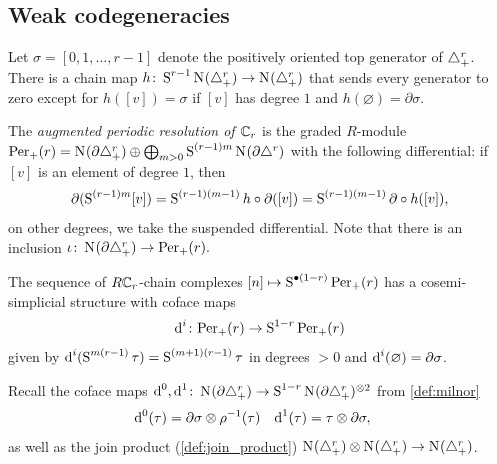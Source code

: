 \subsection{Weak codegeneracies} Let $\sigma = [0,1,\ldots,r-1]$ denote the positively oriented top generator of $\triangle_{+}^{r}$. There is a chain map $h\colon \operatorname{S}^{r-1}\operatorname{N}_{}(\triangle_{+}^{r})\to \operatorname{N}_{}(\triangle_{+}^{r})$ that sends every generator to zero except for $h([v]) = \sigma$ if $[v]$ has degree $1$ and $h(\varnothing) = \partial \sigma$. 
\begin{definition}\cite[Section~I.6]{Brown-cohomology-of-groups}
	The \emph{augmented periodic resolution of $\mathbb{C}_r$} is the graded $R$-module $\mathrm{Per}_+(r) = \operatorname{N}_{}(\partial\triangle_{+}^{r})\oplus \bigoplus_{m>0} \operatorname{S}^{(r-1)m} \operatorname{N}_{}(\partial \triangle^{r})$ with the following differential: if $[v]$ is an element of degree $1$, then
	\[
		\partial(\operatorname{S}^{(r-1)m}[v]) = \operatorname{S}^{(r-1)(m-1)}h\circ \partial([v]) = \operatorname{S}^{(r-1)(m-1)}\partial\circ h([v]),
	\]
	on other degrees, we take the suspended differential. Note that there is an inclusion $\iota\colon \operatorname{N}_{}(\partial\triangle_{+}^r)\to \mathrm{Per}_+(r).$
\end{definition}
\begin{definition}
	The sequence of $R\mathbb{C}_r$-chain complexes $[n]\mapsto \operatorname{S}^{\bullet(1-r)}\mathrm{Per}_+(r)$ has a cosemi-simplicial structure with coface maps
	\[
		\operatorname{d}^i\colon \mathrm{Per}_+(r)\to \operatorname{S}^{1-r}\mathrm{Per}_+(r)
	\]
	given by $\operatorname{d}^i(\operatorname{S}^{m(r-1)}\tau) = \operatorname{S}^{(m+1)(r-1)}\tau$	in degrees $>0$ and $\operatorname{d}^i(\varnothing) = \partial \sigma$.
\end{definition}
	Recall the coface maps $\operatorname{d}^0,\operatorname{d}^1\colon \operatorname{N}_{}(\partial\triangle_{+}^{r})\to \operatorname{S}^{1-r}\operatorname{N}_{}(\partial\triangle_{+}^{r})^{\otimes 2}$ from \cref{def:milnor}
\begin{align*}
	\operatorname{d}^0(\tau) &= \partial \sigma \otimes \rho^{-1}(\tau) 
	&
	\operatorname{d}^1(\tau) &= \tau \otimes \partial \sigma,
\end{align*}
as well as the join product (\cref{def:join_product}) $\operatorname{N}_{}(\triangle_{+}^{r})\otimes \operatorname{N}_{}(\triangle_{+}^{r})\to \operatorname{N}_{}(\triangle_{+}^{r})$.


